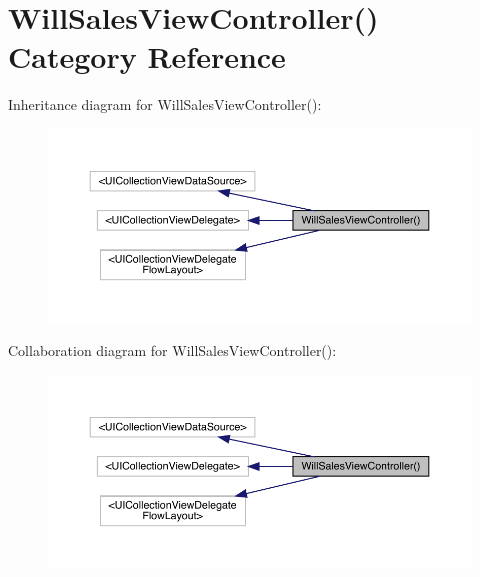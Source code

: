 \hypertarget{category_will_sales_view_controller_07_08}{}\section{Will\+Sales\+View\+Controller() Category Reference}
\label{category_will_sales_view_controller_07_08}


Inheritance diagram for Will\+Sales\+View\+Controller()\+:\nopagebreak
\begin{figure}[H]
\begin{center}
\leavevmode
\includegraphics[width=350pt]{category_will_sales_view_controller_07_08__inherit__graph}
\end{center}
\end{figure}


Collaboration diagram for Will\+Sales\+View\+Controller()\+:\nopagebreak
\begin{figure}[H]
\begin{center}
\leavevmode
\includegraphics[width=350pt]{category_will_sales_view_controller_07_08__coll__graph}
\end{center}
\end{figure}

